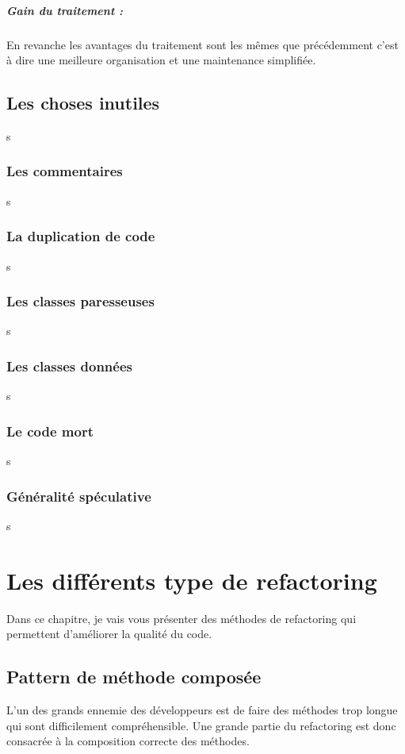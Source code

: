 \documentclass[a4paper,twoside,12pt,openright]{report}
\begin{document}
\paragraph{Gain du traitement :}
En revanche les avantages du traitement sont les mêmes que précédemment c'est à dire une meilleure organisation et une maintenance simplifiée.\\


\section{Les choses inutiles}
s
\subsection{Les commentaires}
s
\subsection{La duplication de code}
s
\subsection{Les classes paresseuses}
s
\subsection{Les classes données}
s
\subsection{Le code mort}
s
\subsection{Généralité spéculative}
s


\chapter{Les différents type de refactoring}
Dans ce chapitre, je vais vous présenter des méthodes de refactoring qui permettent d'améliorer la qualité du code.\\

\section{Pattern de méthode composée}
L'un des grands ennemie des développeurs est de faire des méthodes trop longue qui sont difficilement compréhensible.
Une grande partie du refactoring est donc consacrée à la composition correcte des méthodes.\cite{ref5}\\
\end{document}
